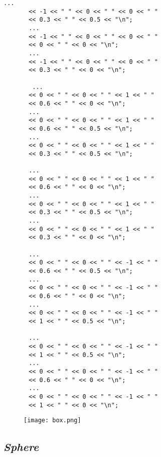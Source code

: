 \documentclass[11pt,a4paper]{report}
\begin{document}
\begin{multicols}{3}
\begin{lstlisting}[style = code]
       ...
       << -1 << " " << 0 << " " << 0 << " "
       << 0.3 << " " << 0.5 << "\n";
       ...
       << -1 << " " << 0 << " " << 0 << " "
       << 0 << " " << 0 << "\n";
       ...
       << -1 << " " << 0 << " " << 0 << " "
       << 0.3 << " " << 0 << "\n";

        ...
       << 0 << " " << 0 << " " << 1 << " "
       << 0.6 << " " << 0 << "\n";
       ...
       << 0 << " " << 0 << " " << 1 << " "
       << 0.6 << " " << 0.5 << "\n";
       ...
       << 0 << " " << 0 << " " << 1 << " "
       << 0.3 << " " << 0.5 << "\n";

       ...
       << 0 << " " << 0 << " " << 1 << " "
       << 0.6 << " " << 0 << "\n";
       ...
       << 0 << " " << 0 << " " << 1 << " "
       << 0.3 << " " << 0.5 << "\n";
       ...
       << 0 << " " << 0 << " " << 1 << " "
       << 0.3 << " " << 0 << "\n";

       ...
       << 0 << " " << 0 << " " << -1 << " "
       << 0.6 << " " << 0.5 << "\n";
       ...
       << 0 << " " << 0 << " " << -1 << " "
       << 0.6 << " " << 0 << "\n";
       ...
       << 0 << " " << 0 << " " << -1 << " "
       << 1 << " " << 0.5 << "\n";

       ...
       << 0 << " " << 0 << " " << -1 << " "
       << 1 << " " << 0.5 << "\n";
       ...
       << 0 << " " << 0 << " " << -1 << " "
       << 0.6 << " " << 0 << "\n";
       ...
       << 0 << " " << 0 << " " << -1 << " "
       << 1 << " " << 0 << "\n";
\end{lstlisting}
\end{multicols}
\begin{figure}[h]
    \centering
    \texttt{[image: box.png]}
\end{figure}

\subsection{\emph{Sphere}}
\end{document}
